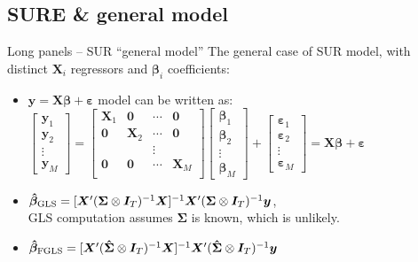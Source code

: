 \documentclass[usenames,dvipsnames]{beamer}
\begin{document}
\subsection*{SURE \& general model}
\begin{frame}{Long panels -- SUR ``general model''}
The general case of SUR model, with distinct $\bm{X}_i$ regressors and $\bm{\beta}_i$ coefficients:\\ \medskip
\begin{itemize}
    \item $\bm{y} = \bm{X} \bm{\beta} + \bm{\varepsilon}$ model can be written as:\\
    \bigskip
    $\begin{bmatrix}
    \bm{y}_1 \\ \bm{y}_2 \\ \vdots \\ \bm{y}_M
    \end{bmatrix} = 
    \begin{bmatrix} 
    \bm{X}_1 & \bm{0} & \cdots & \bm{0} \\ 
    \bm{0} & \bm{X}_2 & \cdots & \bm{0} \\ 
      &   & \vdots &  \\ 
    \bm{0} & \bm{0} & \cdots & \bm{X}_M \\ 
    \end{bmatrix}
    \begin{bmatrix}
    \bm{\beta}_1 \\ \bm{\beta}_2 \\ \vdots \\ \bm{\beta}_M
    \end{bmatrix} + 
    \begin{bmatrix}
    \bm{\varepsilon}_1 \\ \bm{\varepsilon}_2 \\ \vdots \\ \bm{\varepsilon}_M
    \end{bmatrix} = \bm{X\beta}+\bm{\varepsilon}$\\
    \bigskip
    \item $\bm{\hat{\beta}}_{\textnormal{GLS}} = [\bm{X}^{\prime} (\bm{\Sigma} \otimes \bm{I}_T)^{-1} \bm{X}]^{-1} \bm{X}^{\prime} (\bm{\Sigma} \otimes \bm{I}_T)^{-1} \bm{y}$, \\ \smallskip GLS computation assumes $\bm{\Sigma}$ is known, which is unlikely.
    \bigskip
    \item  $\bm{\hat{\beta}}_{\textnormal{FGLS}} = [\bm{X}^{\prime} (\bm{\hat{\Sigma}} \otimes \bm{I}_T)^{-1} \bm{X}]^{-1} \bm{X}^{\prime} (\bm{\hat{\Sigma}} \otimes \bm{I}_T)^{-1} \bm{y}$
\end{itemize}
\end{frame}
\end{document}

